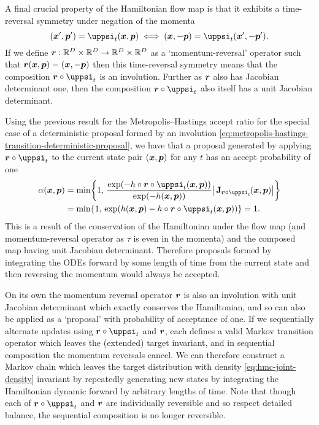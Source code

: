 A final crucial property of the Hamiltonian flow map is that it exhibits a time-reversal symmetry under negation of the momenta
\begin{equation}\label{eq:hamiltonian-dynamic-time-reversal-symmetry}
(\vct{x}',\vct{p}') = \flowmap_t(\vct{x},\vct{p})
\iff
(\vct{x},-\vct{p}) = \flowmap_t(\vct{x}',-\vct{p}').
\end{equation}
If we define $\boldsymbol{r} : \mathbb{R}^D\times\mathbb{R}^D \to \mathbb{R}^D \times \mathbb{R}^D$ as a `momentum-reversal' operator such that $\boldsymbol{r}(\boldsymbol{x},\boldsymbol{p}) = (\boldsymbol{x},-\boldsymbol{p})$ then this time-reversal symmetry means that the composition $\vct{r} \circ \flowmap_t$ is an involution. Further as $\boldsymbol{r}$ also has Jacobian determinant one, then the composition $\vct{r} \circ \flowmap_t$ also itself has a unit Jacobian determinant.

Using the previous result for the Metropolis--Hastings accept ratio for the special case of a deterministic proposal formed by an involution \eqref{eq:metropolis-hastings-transition-deterministic-proposal}, we have that a proposal generated by applying $\vct{r} \circ \flowmap_t$ to the current state pair $(\boldsymbol{x},\boldsymbol{p})$ for any $t$ has an accept probability of one
\begin{align}\label{eq:exact-hmc-accept-probability}
  \alpha(\vct{x},\vct{p}) &=
  \min\lbr 
    1,\,
    \frac
    {
    \exp\lpa
      -\hamiltonian \circ \vct{r} \circ \flowmap_t(\vct{x}, \vct{p})
    \rpa
    }
    {
    \exp\lpa
      -\hamiltonian(\vct{x},\vct{p})
    \rpa
    }
    \left|\,\jacob{\vct{r} \circ \flowmap_t}{\vct{x},\vct{p}}\right|
  \rbr\\
  &=
  \min\lbr 
    1,\,
    \exp\lpa
      \hamiltonian(\vct{x},\vct{p}) -\hamiltonian \circ \vct{r} \circ \flowmap_t(\vct{x}, \vct{p})
    \rpa
  \rbr = 1.
\end{align}
This is a result of the conservation of the Hamiltonian under the flow map (and momentum-reversal operator as $\tau$ is even in the momenta) and the composed map having unit Jacobian determinant. Therefore proposals formed by integrating the \acp{ODE} forward by some length of time from the current state and then reversing the momentum would always be accepted. 

On its own the momentum reversal operator $\boldsymbol{r}$ is also an involution with unit Jacobian determinant which exactly conserves the Hamiltonian, and so can also be applied as a `proposal'  with probability of acceptance of one. If we sequentially alternate updates using $\vct{r} \circ \flowmap_t$ and $\boldsymbol{r}$, each defines a valid Markov transition operator which leaves the (extended) target invariant, and in sequential composition the momentum reversals cancel. We can therefore construct a Markov chain which leaves the target distribution with density \eqref{eq:hmc-joint-density} invariant by repeatedly generating new states by integrating the Hamiltonian dynamic forward by arbitrary lengths of time. Note that though each of $\vct{r} \circ \flowmap_t$ and $\boldsymbol{r}$ are individually reversible and so respect detailed balance, the sequential composition is no longer reversible.

